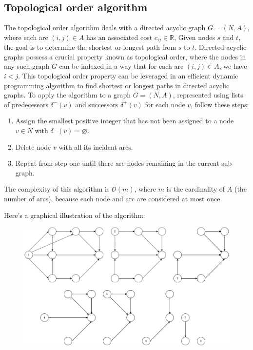 \subsection{Topological order algorithm}
The topological order algorithm deals with a directed acyclic graph $G = (N,A)$, where each arc $(i,j) \in A$ has an associated cost $c_{ij} \in \mathbb{R}$, 
Given nodes $s$ and $t$, the goal is to determine the shortest or longest path from $s$ to $t$.
Directed acyclic graphs possess a crucial property known as topological order, where the nodes in any such graph $G$ can be indexed in a way that for each arc $(i, j) \in A$, we have $i < j$. 
This topological order property can be leveraged in an efficient dynamic programming algorithm to find shortest or longest paths in directed acyclic graphs.
To apply the algorithm to a graph $G = (N,A)$, represented using lists of predecessors $\delta^{-}(v)$ and successors $\delta^{+}(v)$ for each node $v$, follow these steps:
\begin{enumerate}
    \item Assign the smallest positive integer that has not been assigned to a node $v \in N$ with $\delta^{-}(v)=\varnothing$. 
    \item Delete node $v$ with all its incident arcs.
    \item Repeat from step one until there are nodes remaining in the current sub-graph.
\end{enumerate}
The complexity of this algorithm is $\mathcal{O}(m)$, where $m$ is the cardinality of $A$ (the number of arcs), because each node and arc are considered at most once.
\begin{example}
    Here's a graphical illustration of the algorithm:
    \begin{figure}[H]
        \centering
        \includegraphics[width=0.8\linewidth]{images/spath.png}
    \end{figure}
\end{example}

